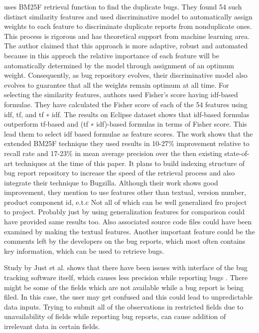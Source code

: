 \documentclass[]{sig-alternate-05-2015}
\begin{document}
\cite{Sun2011} uses BM25F retrieval function to find the duplicate bugs. They found 54 such distinct similarity features and used discriminative model to automatically assign weights to each feature to discriminate duplicate reports from nonduplicate ones. This process is rigorous and has theoretical support from machine learning area. The author claimed that this approach is more adaptive, robust and automated because in this approch the relative importance of each feature will be automatically determined by the model through assignment of an optimum weight. Consequently, as bug repository evolves, their discriminative model also evolves to guarantee that all the weights remain optimum at all time.  For selecting the similarity features, authors used Fisher’s score having idf-based formulae. They have calculated the Fisher score of each of the 54 features using idf, tf, and tf ∗ idf. The results on Eclipse dataset shows that idf-based formulas outperform tf-based and (tf ∗ idf)-based formulas in terms of Fisher score. This lead them to select idf based formulae as feature scores. The work shows that the extended BM25F technique they used results in 10-27\% improvement relative to recall rate and 17-23\% in mean average precision over the then existing state-of-art techniques at the time of this paper. It plans to build indexing structure of bug report repository to increase the speed of the retrieval process and also integrate their technique to Bugzilla. Although their work shows good improvement, they mention to use features other than textual, version number, product component id, e.t.c  Not all of which can be well generalized fro project to project. Probably just by using generalization features for comparison could have provided same results too. Also associated source code files could have been examined by making the textual features. Another important feature could be the comments left by the developers on the bug reports, which most often contains key information, which can be used to retrieve bugs. 

Study by Just et al. shows that there have been issues with interface of the bug tracking software itself, which causes less precision while reporting bugs \cite{Marcus2004}. There might be some of the fields which are not available while a bug report is being filed. In this case, the user may get confused and this could lead to unpredictable data inputs. Trying to submit all of the observations in restricted fields due to unavailability of fields while reporting bug reports, can cause addition of irrelevant data in certain fields.
\end{document}
